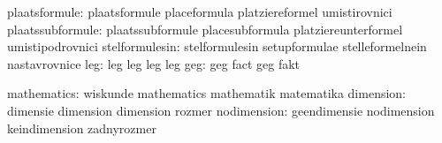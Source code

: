                 plaatsformule:  plaatsformule                placeformula
                                platziereformel              umistirovnici
             plaatssubformule:  plaatssubformule             placesubformula
                                platziereunterformel         umistipodrovnici
               stelformulesin:  stelformulesin               setupformulae
                                stelleformelnein             nastavrovnice
                           leg: leg                          leg 
                                leg                          leg
                           geg: geg                          fact 
                                geg                          fakt

                  mathematics:  wiskunde                     mathematics
                                mathematik                   matematika
                    dimension:  dimensie                     dimension
                                dimension                    rozmer
                  nodimension:  geendimensie                 nodimension
                                keindimension                zadnyrozmer

